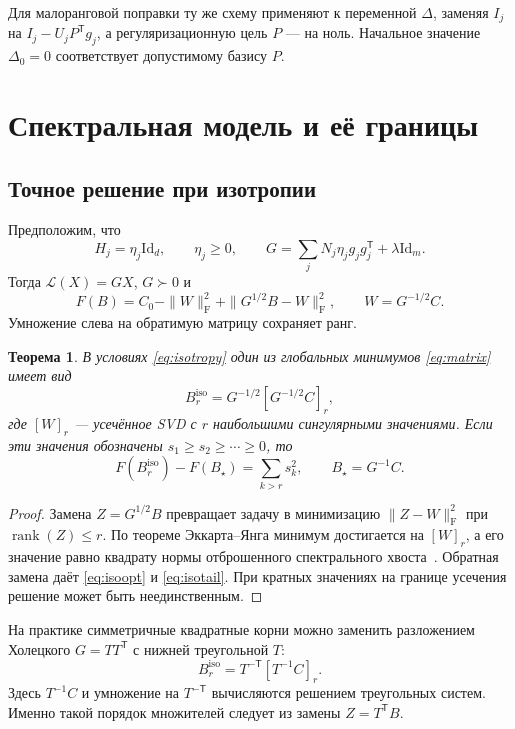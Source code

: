 \documentclass[11pt,a4paper]{article}
\numberwithin{equation}{section}
\newtheorem{theorem}{Теорема}[section]
\theoremstyle{remark}
\newcommand{\Id}{\mathrm{Id}}
\newcommand{\T}{^{\mathsf T}}
\newcommand{\F}{_{\mathrm F}}
\DeclareMathOperator{\rank}{rank}
\begin{document}
Для малоранговой поправки ту же схему применяют к переменной $\Delta$,
заменяя $I_j$ на $I_j-U_jP\T g_j$, а регуляризационную цель $P$ --- на ноль.
Начальное значение $\Delta_0=0$ соответствует допустимому базису $P$.

\section{Спектральная модель и её границы}\label{sec:isotropic}

\subsection{Точное решение при изотропии}
Предположим, что
\begin{equation}\label{eq:isotropy}
 H_j=\eta_j\Id_d,\qquad \eta_j\ge0,
 \qquad G=\sum_jN_j\eta_jg_jg_j\T+\lambda\Id_m.
\end{equation}
Тогда $\mathcal L(X)=GX$, $G\succ0$ и
\begin{equation}\label{eq:whiten}
 F(B)=C_0-\|W\|\F^2+\|G^{1/2}B-W\|\F^2,
 \qquad W=G^{-1/2}C.
\end{equation}
Умножение слева на обратимую матрицу сохраняет ранг.

\begin{theorem}\label{thm:isotropic}
В условиях \eqref{eq:isotropy} один из глобальных минимумов
\eqref{eq:matrix} имеет вид
\begin{equation}\label{eq:isoopt}
 B_r^{\mathrm{iso}}=G^{-1/2}[G^{-1/2}C]_r,
\end{equation}
где $[W]_r$ --- усечённое SVD с $r$ наибольшими сингулярными значениями.
Если эти значения обозначены $s_1\ge s_2\ge\cdots\ge0$, то
\begin{equation}\label{eq:isotail}
 F(B_r^{\mathrm{iso}})-F(B_\star)=\sum_{k>r}s_k^2,
 \qquad B_\star=G^{-1}C.
\end{equation}
\end{theorem}
\begin{proof}
Замена $Z=G^{1/2}B$ превращает задачу в минимизацию
$\|Z-W\|\F^2$ при $\rank(Z)\le r$. По теореме Эккарта--Янга
минимум достигается на $[W]_r$, а его значение равно квадрату нормы
отброшенного спектрального хвоста~\cite{eckart}. Обратная замена даёт
\eqref{eq:isoopt} и \eqref{eq:isotail}.
При кратных значениях на границе усечения решение может быть неединственным.
\end{proof}

На практике симметричные квадратные корни можно заменить разложением
Холецкого $G=TT\T$ с нижней треугольной $T$:
\begin{equation}\label{eq:choleskywhiten}
 B_r^{\mathrm{iso}}=T^{-\mathsf T}[T^{-1}C]_r.
\end{equation}
Здесь $T^{-1}C$ и умножение на $T^{-\mathsf T}$ вычисляются решением
треугольных систем. Именно такой порядок множителей следует из замены
$Z=T\T B$.
\end{document}
